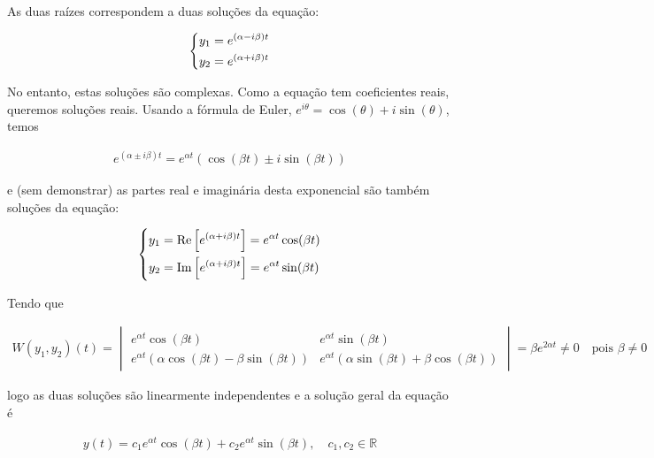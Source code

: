 \documentclass{article}
\begin{document}
As duas raízes correspondem a duas soluções da equação:

\begin{gather*}
\begin{dcases}
y_1 = e^{(\alpha - i \beta) t} \\
y_2 = e^{(\alpha + i \beta) t}
\end{dcases}
\end{gather*}

No entanto, estas soluções são complexas. Como a equação tem coeficientes reais, queremos soluções reais.
Usando a fórmula de Euler, $e^{i \theta} = \cos(\theta) + i \sin(\theta)$, temos

\begin{gather*}
e^{(\alpha \pm i \beta) t} = e^{\alpha t} \left( \cos(\beta t) \pm i \sin(\beta t) \right)
\end{gather*}

e (sem demonstrar) as partes real e imaginária desta exponencial são também soluções da equação:

\begin{gather*}
\begin{dcases}
y_1 = \operatorname{Re}\left[ e^{(\alpha + i \beta) t} \right] = e^{\alpha t} \cos(\beta t) \\
y_2 = \operatorname{Im}\left[ e^{(\alpha + i \beta) t} \right] = e^{\alpha t} \sin(\beta t)
\end{dcases}
\end{gather*}

Tendo que

\begin{gather*}
W(y_1, y_2)(t) =
\begin{vmatrix}
e^{\alpha t} \cos(\beta t) & e^{\alpha t} \sin(\beta t) \\
e^{\alpha t} \left( \alpha \cos(\beta t) - \beta \sin(\beta t) \right) &
e^{\alpha t} \left( \alpha \sin(\beta t) + \beta \cos(\beta t) \right)
\end{vmatrix}
= \beta e^{2 \alpha t} \neq 0 \quad \text{pois } \beta \neq 0
\end{gather*}

logo as duas soluções são linearmente independentes e a solução geral da equação é

\begin{gather*}
\boxed{y(t) = c_1 e^{\alpha t} \cos(\beta t) + c_2 e^{\alpha t} \sin(\beta t), \quad c_1, c_2 \in \mathbb{R}}
\end{gather*}

\bigskip
\end{document}

